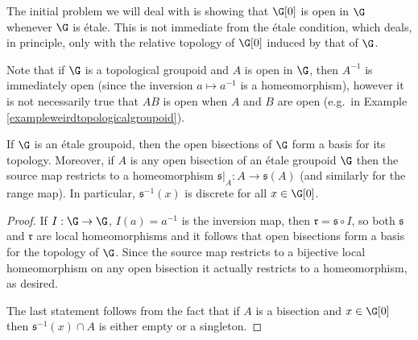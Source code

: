 The initial problem we will deal with is showing that $\G[0]$ is open in $\G$ whenever $\G$ is étale. This is not immediate from the étale condition, which deals, in principle, only with the relative topology of $\G[0]$ induced by that of $\G$.

Note that if $\G$ is a topological groupoid and $A$ is open in $\G$, then $A^{-1}$ is immediately open (since the inversion $a\mapsto a^{-1}$ is a homeomorphism), however it is not necessarily true that $AB$ is open when $A$ and $B$ are open (e.g.\ in Example \ref{exampleweirdtopologicalgroupoid}).

\begin{proposition}\label{propositionetalehasbasisofbisections}
If $\G$ is an étale groupoid, then the open bisections of $\G$ form a basis for its topology. Moreover, if $A$ is any open bisection of an étale groupoid $\G$ then the source map restricts to a homeomorphism $\mathfrak{s}|_A:A\to \mathfrak{s}(A)$ (and similarly for the range map). In particular, $\mathfrak{s}^{-1}(x)$ is discrete for all $x\in\G[0]$.
\end{proposition}
\begin{proof}
If $I:\G\to\G$, $I(a)=a^{-1}$ is the inversion map, then $\mathfrak{r}=\mathfrak{s}\circ I$, so both $\mathfrak{s}$ and $\mathfrak{r}$ are local homeomorphisms and it follows that open bisections form a basis for the topology of $\G$. Since the source map restricts to a bijective local homeomorphism on any open bisection it actually restricts to a homeomorphism, as desired.

The last statement follows from the fact that if $A$ is a bisection and $x\in\G[0]$ then $\mathfrak{s}^{-1}(x)\cap A$ is either empty or a singleton.\qedhere
\end{proof}

